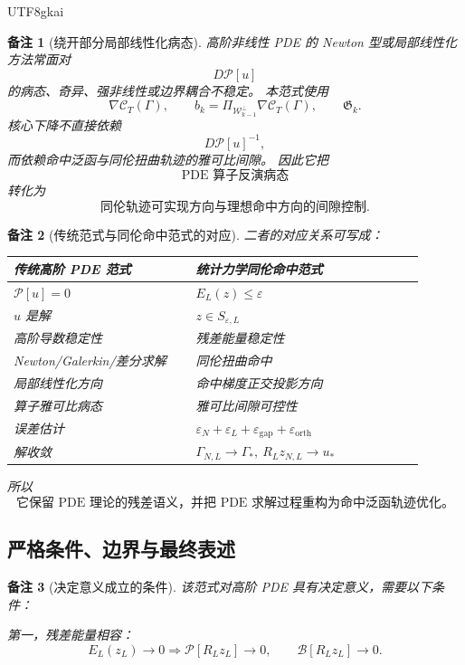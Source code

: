 \documentclass[12pt]{article}
\newtheorem{remark}{备注}[section]
\begin{document}
\begin{CJK*}{UTF8}{gkai}
\begin{remark}[绕开部分局部线性化病态]
高阶非线性 PDE 的 Newton 型或局部线性化方法常面对
\[
  D\mathcal P[u]
\]
的病态、奇异、强非线性或边界耦合不稳定。
本范式使用
\[
  \nabla\mathcal C_T(\Gamma),
  \qquad
  b_k=\Pi_{\mathcal W_{k-1}^{\perp}}\nabla\mathcal C_T(\Gamma),
  \qquad
  \mathfrak G_k.
\]
核心下降不直接依赖
\[
  D\mathcal P[u]^{-1},
\]
而依赖命中泛函与同伦扭曲轨迹的雅可比间隙。
因此它把
\[
  \text{PDE 算子反演病态}
\]
转化为
\[
  \text{同伦轨迹可实现方向与理想命中方向的间隙控制}.
\]
\end{remark}

\begin{remark}[传统范式与同伦命中范式的对应]
二者的对应关系可写成：
\begin{center}
\renewcommand{\arraystretch}{1.35}
\begin{tabular}{p{0.40\linewidth}|p{0.50\linewidth}}
\textbf{传统高阶 PDE 范式} & \textbf{统计力学同伦命中范式}\\
\hline
\(\mathcal P[u]=0\) & \(E_L(z)\le\varepsilon\)\\
\(u\) 是解 & \(z\in S_{\varepsilon,L}\)\\
高阶导数稳定性 & 残差能量稳定性\\
Newton/Galerkin/差分求解 & 同伦扭曲命中\\
局部线性化方向 & 命中梯度正交投影方向\\
算子雅可比病态 & 雅可比间隙可控性\\
误差估计 &
\(\varepsilon_N+\varepsilon_L+\varepsilon_{\mathrm{gap}}
+\varepsilon_{\mathrm{orth}}\)\\
解收敛 & \(\Gamma_{N,L}\to\Gamma_*,\ R_Lz_{N,L}\to u_*\)
\end{tabular}
\end{center}
所以
\[
  \boxed{
  \text{它保留 PDE 理论的残差语义，并把 PDE 求解过程重构为命中泛函轨迹优化。}
  }
\]
\end{remark}

\subsection{严格条件、边界与最终表述}
\label{subsec:tex55-pde-boundary-final}

\begin{remark}[决定意义成立的条件]
该范式对高阶 PDE 具有决定意义，需要以下条件：

第一，残差能量相容：
\[
  E_L(z_L)\to0
  \Longrightarrow
  \mathcal P[R_Lz_L]\to0,
  \qquad
  \mathcal B[R_Lz_L]\to0.
\]


\end{remark}
\end{CJK*}
\end{document}
